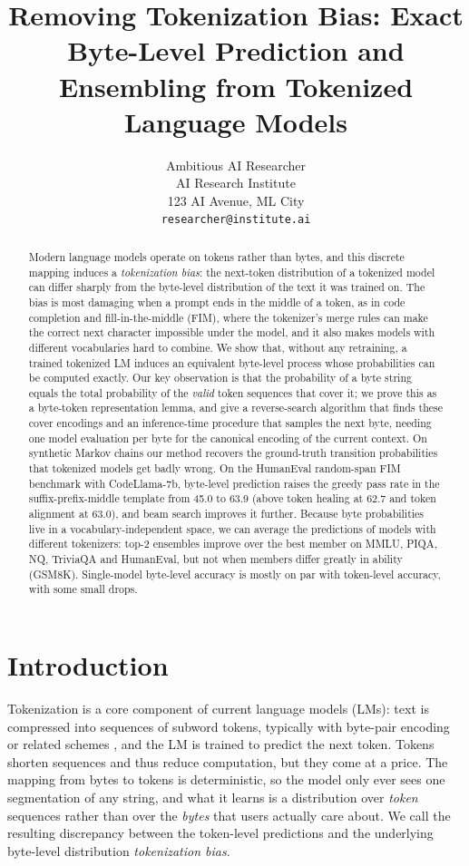 \documentclass{article} %
\title{Removing Tokenization Bias: Exact Byte-Level Prediction and Ensembling from Tokenized Language Models}
\author{Ambitious AI Researcher\\
AI Research Institute\\
123 AI Avenue, ML City\\
\texttt{researcher@institute.ai}
}
\begin{document}
\maketitle

\begin{abstract}
Modern language models operate on tokens rather than bytes, and this discrete mapping induces a \emph{tokenization bias}: the next-token distribution of a tokenized model can differ sharply from the byte-level distribution of the text it was trained on. The bias is most damaging when a prompt ends in the middle of a token, as in code completion and fill-in-the-middle (FIM), where the tokenizer's merge rules can make the correct next character impossible under the model, and it also makes models with different vocabularies hard to combine. We show that, without any retraining, a trained tokenized LM induces an equivalent byte-level process whose probabilities can be computed exactly. Our key observation is that the probability of a byte string equals the total probability of the \emph{valid} token sequences that cover it; we prove this as a byte-token representation lemma, and give a reverse-search algorithm that finds these cover encodings and an inference-time procedure that samples the next byte, needing one model evaluation per byte for the canonical encoding of the current context. On synthetic Markov chains our method recovers the ground-truth transition probabilities that tokenized models get badly wrong. On the HumanEval random-span FIM benchmark with CodeLlama-7b, byte-level prediction raises the greedy pass rate in the suffix-prefix-middle template from 45.0 to 63.9 (above token healing at 62.7 and token alignment at 63.0), and beam search improves it further. Because byte probabilities live in a vocabulary-independent space, we can average the predictions of models with different tokenizers: top-2 ensembles improve over the best member on MMLU, PIQA, NQ, TriviaQA and HumanEval, but not when members differ greatly in ability (GSM8K). Single-model byte-level accuracy is mostly on par with token-level accuracy, with some small drops.
\end{abstract}

\section{Introduction}
\label{sec:intro}
Tokenization is a core component of current language models (LMs): text is compressed into sequences of subword tokens, typically with byte-pair encoding \citep{gage1994new,sennrich2016neural} or related schemes \citep{kudo2018sentencepiece}, and the LM is trained to predict the next token. Tokens shorten sequences and thus reduce computation, but they come at a price. The mapping from bytes to tokens is deterministic, so the model only ever sees one segmentation of any string, and what it learns is a distribution over \emph{token} sequences rather than over the \emph{bytes} that users actually care about. We call the resulting discrepancy between the token-level predictions and the underlying byte-level distribution \emph{tokenization bias}.
\end{document}
